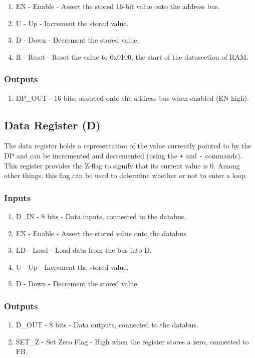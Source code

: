 \begin{enumerate}
\itemsep0em 
\item EN - Enable - Assert the stored 16-bit value onto the address bus.
\item U - Up - Increment the stored value.
\item D - Down - Decrement the stored value.
\item R - Reset - Reset the value to 0x0100, the start of the datasection of RAM.
\end{enumerate}

\subsubsection*{Outputs}
\begin{enumerate}
\itemsep0em   
\item DP\_OUT - 16 bits, asserted onto the address bus when enabled (EN high).
\end{enumerate}

\subsection{Data Register (D)} \label{sec:architecture:d}
The data register holds a representation of the value currently pointed to by the DP and can be incremented and decremented (using the \texttt{+} and \texttt{-} commands). This register provides the Z-flag to signify that its current value is 0. Among other things, this flag can be used to determine whether or not to enter a loop.

\subsubsection*{Inputs}
\begin{enumerate}
\itemsep0em   
\item D\_IN - 8 bits - Data inputs, connected to the databus.
\item EN - Enable - Assert the stored value onto the databus.
\item LD - Load - Load data from the bus into D.
\item U - Up - Increment the stored value.
\item D - Down - Decrement the stored value.
\end{enumerate}

\subsubsection*{Outputs}
\begin{enumerate}
\itemsep0em 
\item D\_OUT - 8 bits - Data outputs, connected to the databus.
\item SET\_Z - Set Zero Flag - High when the register stores a zero, connected to FB.
\end{enumerate}


